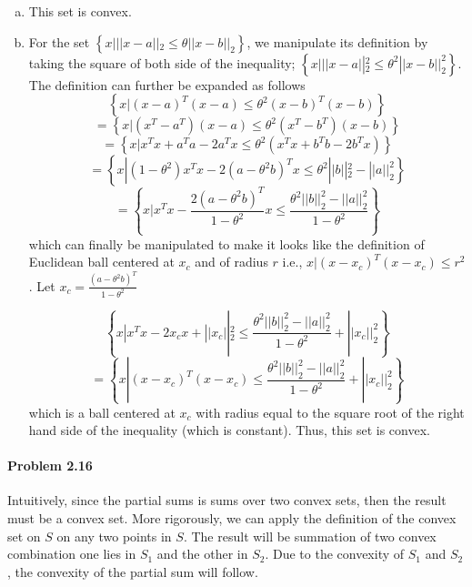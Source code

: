 \documentclass[12pt] {article}
\begin{document}
\begin{enumerate}[(a)]
\item This set is convex. 

\item For the set $\left\lbrace x | ||x-a||_2 \leq \theta ||x-b||_2 \right\rbrace$, we manipulate its definition by taking the square of both side of the inequality; $\left\lbrace x | ||x-a||^{2}_{2} \leq \theta^{2} ||x-b||^{2}_{2} \right\rbrace$. The definition can further be expanded as follows 
$$\left\lbrace x |  (x-a)^{T}(x-a) \leq \theta^{2}(x-b)^{T}(x-b)\right\rbrace$$
$$=\left\lbrace x |  (x^{T}-a^{T})(x-a) \leq \theta^{2}(x^{T}-b^{T})(x-b)\right\rbrace$$
$$=\left\lbrace x |   x^{T}x + a^{T}a- 2a^{T}x \leq \theta^{2}(x^{T}x+b^{T}b-2b^{T}x) \right\rbrace$$
$$=\left\lbrace x |  (1-\theta^{2})x^{T}x - 2(a-\theta^{2}b)^{T}x \leq  \theta^{2}||b||^{2}_{2} - ||a||^{2}_{2} \right\rbrace$$
$$=\left\lbrace x |  x^{T}x - \frac{2(a-\theta^2b)^{T}}{1-\theta^2}x \leq  \frac{\theta^{2}||b||^{2}_{2} - ||a||^{2}_{2}}{1-\theta^2} \right\rbrace$$
which can finally be manipulated to make it looks like the definition of Euclidean ball centered at $x_{c}$ and of radius $r$ i.e., ${x |(x-x_{c})^{T}(x-x_{c})\leq r^{2}}$. Let $x_{c} = \frac{(a-\theta^2b)^{T}}{1-\theta^2}$

$$\left\lbrace x  |  x^{T}x - 2x_{c}x + ||x_{c}||^{2}_{2}  \leq  \frac{\theta^{2}||b||^{2}_{2} - ||a||^{2}_{2}}{1-\theta^2} + ||x_{c}||^{2}_{2} \right\rbrace$$
$$=\left\lbrace x |  (x-x_{c})^{T}(x-x_{c})  \leq  \frac{\theta^{2}||b||^{2}_{2} - ||a||^{2}_{2}}{1-\theta^2} + ||x_{c}||^{2}_{2} \right\rbrace$$
which is a ball centered at $x_{c}$ with radius equal to the square root of the right hand side of the inequality (which is constant). Thus, this set is convex. 
\end{enumerate}

\paragraph{Problem 2.16} 
Intuitively, since the partial sums is sums over two convex sets, then the result must be a convex set. More rigorously, we can apply the definition of the convex set on $S$ on any two points in $S$. The result will be summation of two convex combination one lies in $S_{1}$ and the other in $S_{2}$. Due to the convexity of $S_{1}$ and $S_{2}$, the convexity of the partial sum will follow. 
\end{document}
